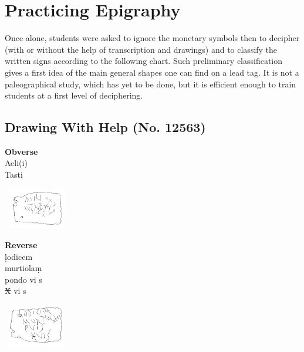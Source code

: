 \documentclass[amsthm,ebook]{saparticle}
\begin{document}
\section{Practicing Epigraphy}


\noindent Once alone, students were asked to ignore the monetary symbols then to decipher (with or without the help of
transcription and drawings) and to classify the written signs according to the following chart. Such preliminary
classification gives a first idea of the main general shapes one can find on a lead tag. It is not a paleographical
study, which has yet to be done, but it is efficient enough to train students at a first level of deciphering.

\subsection{Drawing With Help (No. 12563)}

\begin{minipage}[t]{0.18\textwidth}
\textbf{Obverse}\\
Aeli(i)\\
Tasti
\end{minipage}
\begin{minipage}[c]{0.27\textwidth}
\includegraphics[width=2.965cm,height=1.79cm]{EAGLE16lameetalteaching-img006.png}
\end{minipage}
\begin{minipage}[t]{0.18\textwidth}
\textbf{Reverse}\\
\d{l}odicem\\
murtiola\d{m}\\
pondo vi s\\
\sout{X} vi s\\
\end{minipage}
\begin{minipage}[c]{0.25\textwidth}
\includegraphics[width=2.845cm,height=1.896cm]{EAGLE16lameetalteaching-img007.png}
\end{minipage}
\end{document}
